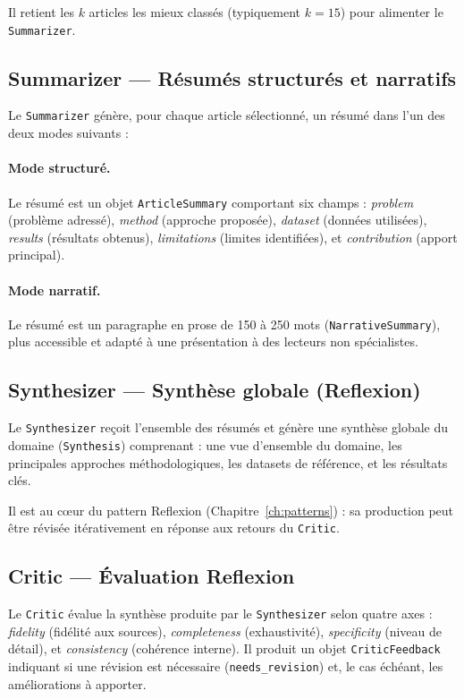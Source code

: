 Il retient les $k$ articles les mieux classés (typiquement $k = 15$)
pour alimenter le \texttt{Summarizer}.

\subsection{Summarizer — Résumés structurés et narratifs}

Le \texttt{Summarizer} génère, pour chaque article sélectionné, un résumé
dans l'un des deux modes suivants :

\paragraph{Mode structuré.}
Le résumé est un objet \texttt{ArticleSummary} comportant six champs :
\textit{problem} (problème adressé), \textit{method} (approche proposée),
\textit{dataset} (données utilisées), \textit{results} (résultats obtenus),
\textit{limitations} (limites identifiées), et \textit{contribution}
(apport principal).

\paragraph{Mode narratif.}
Le résumé est un paragraphe en prose de 150 à 250 mots (\texttt{NarrativeSummary}),
plus accessible et adapté à une présentation à des lecteurs non spécialistes.

\subsection{Synthesizer — Synthèse globale (Reflexion)}

Le \texttt{Synthesizer} reçoit l'ensemble des résumés et génère une
synthèse globale du domaine (\texttt{Synthesis}) comprenant : une vue
d'ensemble du domaine, les principales approches méthodologiques,
les datasets de référence, et les résultats clés.

Il est au cœur du pattern Reflexion (Chapitre~\ref{ch:patterns}) :
sa production peut être révisée itérativement en réponse aux retours du
\texttt{Critic}.

\subsection{Critic — Évaluation Reflexion}

Le \texttt{Critic} évalue la synthèse produite par le \texttt{Synthesizer}
selon quatre axes : \textit{fidelity} (fidélité aux sources), \textit{completeness}
(exhaustivité), \textit{specificity} (niveau de détail), et \textit{consistency}
(cohérence interne). Il produit un objet \texttt{CriticFeedback} indiquant
si une révision est nécessaire (\texttt{needs\_revision}) et, le cas échéant,
les améliorations à apporter.

